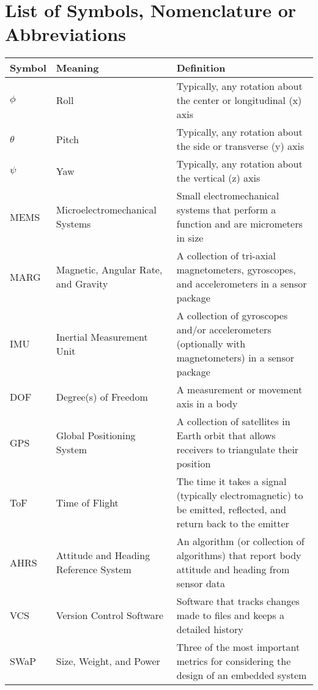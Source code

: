 \chapter*{List of Symbols, Nomenclature or
Abbreviations} 

\begin{longtable}{l m{} m{}}
        Symbol & Meaning & Definition \\
        \hline
        $\phi$ & Roll & Typically, any rotation about the center or longitudinal (x) axis \\
        $\theta$ & Pitch & Typically, any rotation about the side or transverse (y) axis \\
        $\psi$ & Yaw & Typically, any rotation about the vertical (z) axis \\
        MEMS & Microelectromechanical Systems & Small electromechanical systems that perform a function and are micrometers in size \\
        MARG & Magnetic, Angular Rate, and Gravity & A collection of tri-axial magnetometers, gyroscopes, and accelerometers in a sensor package \\
        IMU & Inertial Measurement Unit & A collection of gyroscopes and/or accelerometers (optionally with magnetometers) in a sensor package \\
        DOF & Degree(s) of Freedom & A measurement or movement axis in a body \\
        GPS & Global Positioning System & A collection of satellites in Earth orbit that allows receivers to triangulate their position \\
        ToF & Time of Flight & The time it takes a signal (typically electromagnetic) to be emitted, reflected, and return back to the emitter \\
        AHRS & Attitude and Heading Reference System & An algorithm (or collection of algorithms) that report body attitude and heading from sensor data \\
        VCS & Version Control Software & Software that tracks changes made to files and keeps a detailed history \\
        SWaP & Size, Weight, and Power & Three of the most important metrics for considering the design of an embedded system \\

\end{longtable}
